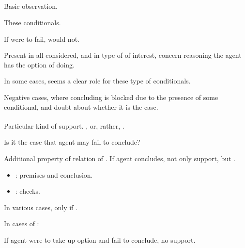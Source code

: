 \subsection{\zS{}}
\label{sec:zs}

\begin{note}
  Basic observation.

  These conditionals.

  If were to fail, would not.

  Present in all  considered, and in type of  of interest, concern reasoning the agent has the option of doing.

  In some cases, seems a clear role for these type of conditionals.
\end{note}

\begin{note}
  Negative cases, where concluding is blocked due to the presence of some conditional, and doubt about whether it is the case.
\end{note}

\paragraph{}

\begin{note}[`\zSN{0}']
  Particular kind of support.
  , or, rather, \zS{}.

  Is it the case that agent may fail to conclude?

  Additional property of relation of \support{}.
  If agent concludes, not only support, but \zS{}.
  \begin{itemize}
  \item
    : premises and conclusion.
  \item
    \zS{}: checks.
  \end{itemize}

  In various cases, \support{} only if \zS{}.
\end{note}

\begin{note}
  \begin{idea}
    In cases of \zS{}:

    If agent were to take up option and fail to conclude, no support.
  \end{idea}
\end{note}

